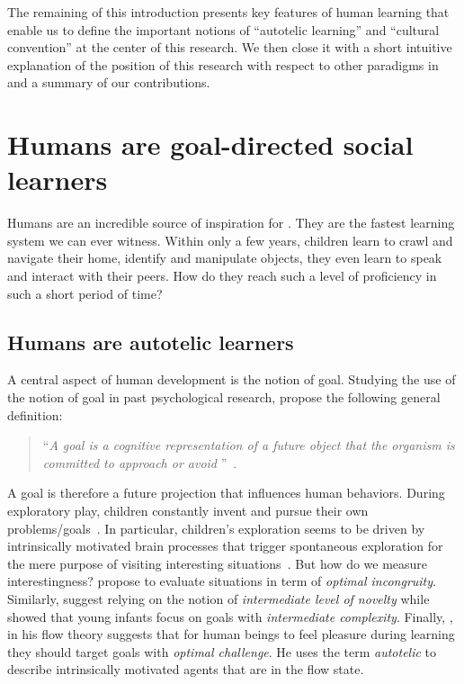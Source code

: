 The remaining of this introduction presents key features of human learning that enable us to define the important notions of ``autotelic learning'' and ``cultural convention'' at the center of this research. We then close it with a short intuitive explanation of the position of this research with respect to other paradigms in \ai and a summary of our contributions.


\section{Humans are goal-directed social learners}

Humans are an incredible source of inspiration for \ai. They are the fastest learning system we can ever witness. Within only a few years, children learn to crawl and navigate their home, identify and manipulate objects, they even learn to speak and interact with their peers. How do they reach such a level of proficiency in such a short period of time? 

\subsection{Humans are autotelic learners}
\label{sec:humans_autotelic}

A central aspect of human development is the notion of goal. Studying the use of the notion of goal in past psychological research, \citet{elliot2008goal} propose the following general definition:
\begin{quote}
   	``\textit{A goal is a cognitive representation of a future object that the organism is committed to approach or
    avoid} ''~\citep{elliot2008goal}.
\end{quote}
%
A goal is therefore a future projection that influences human behaviors. During exploratory play, children constantly invent and pursue their own problems/goals~\citep{chu2020exploratory}. In particular, children's exploration seems to be driven by intrinsically motivated brain processes that trigger spontaneous exploration for the mere purpose of visiting interesting situations~\citep{gopnik1999scientist,kaplan2007search,kidd_psychology_2015}. But how do we measure interestingness?  \citet{hunt1965} propose to evaluate situations in term of \textit{optimal incongruity}. Similarly, \citet{berlyne1966curiosity} suggest relying on the notion of \textit{intermediate level of novelty} while \citet{Kidd2012TheGE} showed that young infants focus on goals with \textit{intermediate complexity}.  Finally, \citet{csikzentmihalyi1997finding}, in his flow theory suggests that for human beings to feel pleasure during learning they should target goals with \textit{optimal challenge}. He uses the term \textit{autotelic} to describe intrinsically motivated agents that are in the flow state. 

